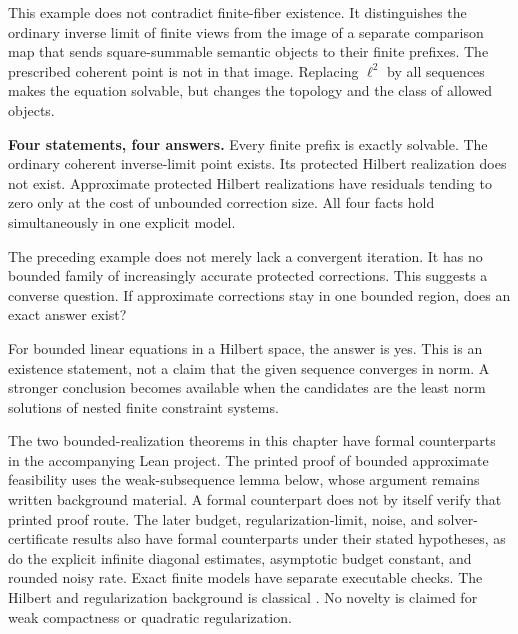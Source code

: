 This example does not contradict finite-fiber existence. It distinguishes the ordinary inverse limit of finite views from the image of a separate comparison map that sends square-summable semantic objects to their finite prefixes. The prescribed coherent point is not in that image. Replacing \(\ell^2\) by all sequences makes the equation solvable, but changes the topology and the class of allowed objects.

\begin{insight}
\textbf{Four statements, four answers.} Every finite prefix is exactly solvable. The ordinary coherent inverse-limit point exists. Its protected Hilbert realization does not exist. Approximate protected Hilbert realizations have residuals tending to zero only at the cost of unbounded correction size. All four facts hold simultaneously in one explicit model.
\end{insight}




\label{KS:sec:bounded-realization}
The preceding example does not merely lack a convergent iteration. It has no bounded family of increasingly accurate protected corrections. This suggests a converse question. If approximate corrections stay in one bounded region, does an exact answer exist?

For bounded linear equations in a Hilbert space, the answer is yes. This is an existence statement, not a claim that the given sequence converges in norm. A stronger conclusion becomes available when the candidates are the least norm solutions of nested finite constraint systems.

\begin{scopebox}
The two bounded-realization theorems in this chapter have formal counterparts in the accompanying Lean project. The printed proof of bounded approximate feasibility uses the weak-subsequence lemma below, whose argument remains written background material. A formal counterpart does not by itself verify that printed proof route. The later budget, regularization-limit, noise, and solver-certificate results also have formal counterparts under their stated hypotheses, as do the explicit infinite diagonal estimates, asymptotic budget constant, and rounded noisy rate. Exact finite models have separate executable checks. The Hilbert and regularization background is classical \cite{KS:clason-inverse}. No novelty is claimed for weak compactness or quadratic regularization.
\end{scopebox}

